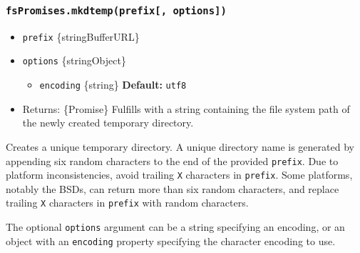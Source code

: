 \subsubsection{\texorpdfstring{\texttt{fsPromises.mkdtemp(prefix{[},\ options{]})}}{fsPromises.mkdtemp(prefix{[}, options{]})}}\label{fspromises.mkdtempprefix-options}

\begin{itemize}
\tightlist
\item
  \texttt{prefix} \{string\textbar Buffer\textbar URL\}
\item
  \texttt{options} \{string\textbar Object\}

  \begin{itemize}
  \tightlist
  \item
    \texttt{encoding} \{string\} \textbf{Default:}
    \texttt{\textquotesingle{}utf8\textquotesingle{}}
  \end{itemize}
\item
  Returns: \{Promise\} Fulfills with a string containing the file system
  path of the newly created temporary directory.
\end{itemize}

Creates a unique temporary directory. A unique directory name is
generated by appending six random characters to the end of the provided
\texttt{prefix}. Due to platform inconsistencies, avoid trailing
\texttt{X} characters in \texttt{prefix}. Some platforms, notably the
BSDs, can return more than six random characters, and replace trailing
\texttt{X} characters in \texttt{prefix} with random characters.

The optional \texttt{options} argument can be a string specifying an
encoding, or an object with an \texttt{encoding} property specifying the
character encoding to use.

\begin{Shaded}
\begin{Highlighting}[]
 \OperatorTok{;}
 \OperatorTok{;}
 \OperatorTok{;}

\NormalTok{ \{}
   \NormalTok{(}\NormalTok{(}\NormalTok{()}\OperatorTok{,} \NormalTok{))}\OperatorTok{;}
\NormalTok{\} }
  \OperatorTok{;}
\NormalTok{\}}
\end{Highlighting}
\end{Shaded}

